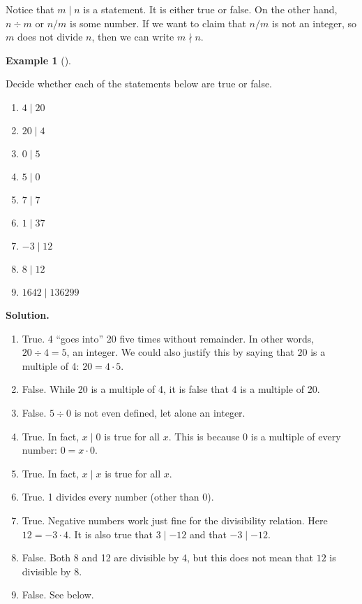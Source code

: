 \documentclass[10pt,]{book}
\theoremstyle{plain}
\theoremstyle{definition}
\newtheorem{example}[theorem]{Example}
\theoremstyle{definition}
\theoremstyle{definition}
\numberwithin{equation}{chapter}
\begin{document}
Notice that \(m \mid n\) is a statement. It is either true or false. On the other hand, \(n \div m\) or \(n/m\) is some number. If we want to claim that \(n/m\) is not an integer, so \(m\) does not divide \(n\), then we can write \(m \nmid n\).
%
\begin{example}[]\label{example-115}

Decide whether each of the statements below are true or false.
%
\leavevmode%
\begin{enumerate}
\item\hypertarget{li-1374}{}\(4 \mid 20\)%
\item\hypertarget{li-1375}{}\(20 \mid 4\)%
\item\hypertarget{li-1376}{}\(0 \mid 5\)%
\item\hypertarget{li-1377}{}\(5 \mid 0\)%
\item\hypertarget{li-1378}{}\(7 \mid 7\)%
\item\hypertarget{li-1379}{}\(1 \mid 37\)%
\item\hypertarget{li-1380}{}\(-3 \mid 12\)%
\item\hypertarget{li-1381}{}\(8 \mid 12\)%
\item\hypertarget{li-1382}{}\(1642 \mid 136299\)%
\end{enumerate}
\par\medskip\noindent%
\textbf{Solution.}\quad \leavevmode%
\begin{enumerate}
\item\hypertarget{li-1383}{}
True.  4 ``goes into'' 20 five times without remainder.  In other words, \(20 \div 4 = 5\), an integer. We could also justify this by saying that \(20\) is a multiple of 4: \(20 = 4\cdot 5\).
%
\item\hypertarget{li-1384}{}
False. While 20 is a multiple of 4, it is false that \(4\) is a multiple of 20.
%
\item\hypertarget{li-1385}{}
False.  \(5 \div 0\) is not even defined, let alone an integer.
%
\item\hypertarget{li-1386}{}
True.  In fact, \(x \mid 0\) is true for all \(x\).  This is because 0 is a multiple of every number: \(0 = x\cdot 0\).
%
\item\hypertarget{li-1387}{}
True.  In fact, \(x \mid x\) is true for all \(x\).
%
\item\hypertarget{li-1388}{}
True.  1 divides every number (other than 0).
%
\item\hypertarget{li-1389}{}
True.  Negative numbers work just fine for the divisibility relation.  Here \(12 = -3 \cdot 4\).	It is also true that \(3 \mid -12\) and that \(-3 \mid -12\).
%
\item\hypertarget{li-1390}{}
False.  Both 8 and 12 are divisible by 4, but this does not mean that \(12\) is divisible by \(8\).
%
\item\hypertarget{li-1391}{}
False. See below.
%
\end{enumerate}
\end{example}
\par
\end{document}

